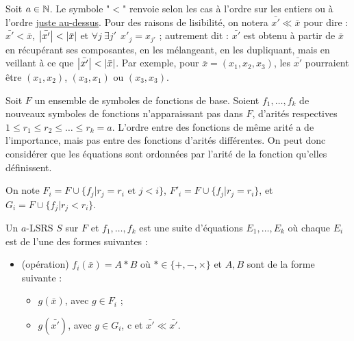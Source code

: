 			Soit $a \in \mathbb{N}$. Le symbole "$<$" renvoie selon les cas à l'ordre sur les entiers ou à l'ordre \hyperref[def:bon_ordre_sur_uplets]{juste au-dessus}. Pour des raisons de lisibilité, on notera $\bar{x'} \ll \bar{x}$ pour dire :  $\bar{x'} < \bar{x}$, $\left|\bar{x'}\right| < \left|\bar{x}\right|$ et $\forall j \: \exists j' \:\: x'_j = x_{j'}$ ; autrement dit : $\bar{x'}$ est obtenu à partir de $\bar{x}$ en récupérant ses composantes, en les mélangeant, en les dupliquant, mais en veillant à ce que $\left|\bar{x'}\right| < \left|\bar{x}\right|$. Par exemple, pour $\bar{x} = (x_1, x_2, x_3)$, les $\bar{x'}$ pourraient être $(x_1, x_2)$, $(x_3, x_1)$ ou $(x_3, x_3)$.
			
			\begin{definition}[$a$-LSRS]
				\label{def:aLSRS}
				Soit $F$ un ensemble de symboles de fonctions de base. Soient $f_1, \dots, f_k$ de nouveaux symboles de fonctions n'apparaissant pas dans $F$, d'arités respectives $1 \leqslant r_1 \leqslant r_2 \leqslant \dots \leqslant r_k = a$. L'ordre entre des fonctions de même arité a de l'importance, mais pas entre des fonctions d'arités différentes. On peut donc considérer que les équations sont ordonnées par l'arité de la fonction qu'elles définissent.
				
				On note $F_i = F \cup \{f_j | r_j = r_i \text{ et } j < i\}$, $F'_i = F \cup \{f_j | r_j = r_i\}$, et $G_i = F \cup \{ f_j | r_j < r_i\}$\footnotemark.
				
					
				Un $a$-LSRS $S$ sur $F$ et $f_1, \dots, f_k$ est une suite d'équations $E_1, \dots, E_k$ où chaque $E_i$ est de l'une des formes suivantes :
				
				\begin{itemize}[itemsep=-1mm]
					\item	(opération) 	$f_i\left(\bar{x}\right) = A * B$ où $* \in \{+,-,\times\}$ et $A, B$ sont de la forme suivante : 
							\begin{itemize}[itemsep=-1mm]
								\item 	$g\left(\bar{x}\right)$, avec $g \in F_i$ ;
								\item 	$g\left(\bar{x'}\right)$, avec $g \in G_i$, c et $\bar{x'} \ll \bar{x'}$.
							\end{itemize}
										

\end{itemize}
\end{definition}
